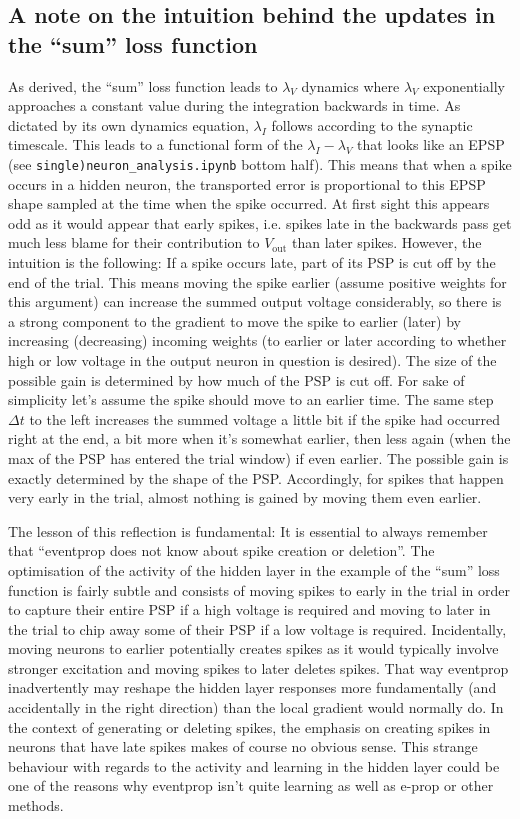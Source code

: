 \documentclass[a4paper]{article}
\begin{document}
  \subsection{A note on the intuition behind the updates in the ``sum'' loss function}
  As derived, the ``sum'' loss function leads to $\lambda_V$ dynamics where $\lambda_V$ exponentially approaches a constant value during the integration backwards in time. As dictated by its own dynamics equation, $\lambda_I$ follows according to the synaptic timescale. This leads to a functional form of the $\lambda_I-\lambda_V$ that looks like an EPSP (see \verb+single)neuron_analysis.ipynb+ bottom half). This means that when a spike occurs in a hidden neuron, the transported error is proportional to this EPSP shape sampled at the time when the spike occurred. At first sight this appears odd as it would appear that early spikes, i.e. spikes late in the backwards pass get much less blame for their contribution to $V_{\text{out}}$ than later spikes. However, the intuition is the following: If a spike occurs late, part of its PSP is cut off by the end of the trial. This means moving the spike earlier (assume positive weights for this argument) can increase the summed output voltage considerably, so there is a strong component to the gradient to move the spike to earlier (later) by increasing (decreasing) incoming weights (to earlier or later according to whether high or low voltage in the output neuron in question is desired). The size of the possible gain is determined by how much of the PSP is cut off. For sake of simplicity let's assume the spike should move to an earlier time. The same step $\Delta t$ to the left increases the summed voltage a little bit if the spike had occurred right at the end, a bit more when it's somewhat earlier, then less again (when the max of the PSP has entered the trial window) if even earlier. The possible gain is exactly determined by the shape of the PSP. Accordingly, for spikes that happen very early in the trial, almost nothing is gained by moving them even earlier.

  The lesson of this reflection is fundamental: It is essential to always remember that ``eventprop does not know about spike creation or deletion''. The optimisation of the activity of the hidden layer in the example of the ``sum'' loss function is fairly subtle and consists of moving spikes to early in the trial in order to capture their entire PSP if a high voltage is required and moving to later in the trial to chip away some of their PSP if a low voltage is required. Incidentally, moving neurons to earlier potentially creates spikes as it would typically involve stronger excitation and moving spikes to later deletes spikes. That way eventprop inadvertently may reshape the hidden layer responses more fundamentally (and accidentally in the right direction) than the local gradient would normally do. In the context of generating or deleting spikes, the emphasis on creating spikes in neurons that have late spikes makes of course no obvious sense. This strange behaviour with regards to the activity and learning in the hidden layer could be one of the reasons why eventprop isn't quite learning as well as e-prop or other methods.
\end{document}
